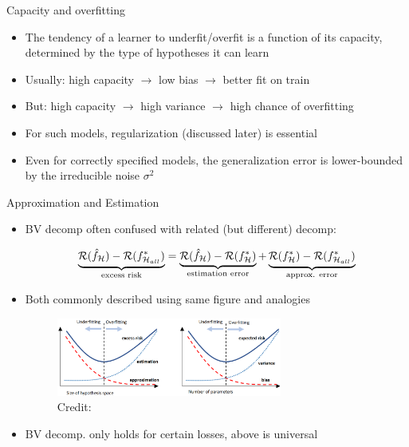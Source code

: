 \documentclass[11pt,compress,t,notes=noshow, xcolor=table]{beamer}
\begin{document}
\begin{vbframe}{Capacity and overfitting}
\begin{itemize}
  \item The tendency of a learner to underfit/overfit is a function of its capacity, determined by the type of hypotheses it can learn
  \item Usually: high capacity $\rightarrow$ low bias $\rightarrow$ better fit on train
  \item But: high capacity $\rightarrow$ high variance $\rightarrow$ high chance of overfitting
  \item For such models, regularization (discussed later) is essential
  \item Even for correctly specified models, the generalization error is lower-bounded by the irreducible noise $\sigma^2$
\end{itemize}
\end{vbframe}


\begin{vbframe}{Approximation and Estimation  }

\begin{itemize}

\item BV decomp often confused with related (but different) decomp: 

$$
    \underbrace{\mathcal{R}(\hat f_{\mathcal{H}}) - \mathcal{R}(f^{\ast}_{\mathcal{H}_{all}})}_{\text{excess risk}} = \underbrace{\mathcal{R}(\hat f_{\mathcal{H}}) - \mathcal{R}(f^{\ast}_{\mathcal{H}})}_{\text{estimation error}} + \underbrace{\mathcal{R}(f^{\ast}_{\mathcal{H}}) -  \mathcal{R}(f^{\ast}_{\mathcal{H}_{all}})}_{\text{approx. error}} 
$$

\item Both commonly described using same figure and analogies

\vfill

\begin{figure}
    \centering
    \includegraphics[width = 0.7\textwidth]{figure_man/biasvar-vs-estapprox-tradeoff.png}
    \tiny{\\ Credit: \cite{BROWN2024BIAS}}
  \end{figure}

\vfill


\item BV decomp. only holds for certain losses, above is universal

\end{itemize}

\end{vbframe}
\end{document}
